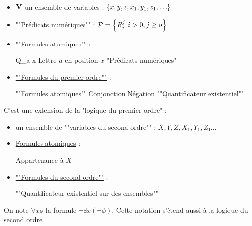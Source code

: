 \begin{definition} 
	\ \newline
	\begin{itemize}
		\item $\mathbf{V}$ un ensemble de variables : $\left\{x,y,z,x_1,y_1,z_1, \ldots\right\}$
		\item \underline{""Prédicats numériques""} :  $\mathcal{P} = \left\{R_i^j, i > 0, j \geq o\right\}$
		\item \underline{""Formules atomiques""} :
		      \begin{syntaxdef}
			      \syntaxHeader {\alpha} {Q_a x} {Lettre $a$ en position $x$}
			       {"Prédicats numériques"}
		      \end{syntaxdef}
		\item \underline{""Formules du premier ordre""} :
		      \begin{syntaxdef}
			      \syntaxHeader {\phi} {\alpha} {""Formules atomiques""}
			      \syntax {\phi \land \phi} {Conjonction}
			      \syntax {\lnot \phi} {Négation}
			       {""Quantificateur existentiel""}
		      \end{syntaxdef}
	\end{itemize}
\end{definition}


\begin{definition} 
	C'est une extension de la "logique du premier ordre" :
	\begin{itemize}
		\item un ensemble de ""variables du second ordre"" : $X,Y,Z,X_1,Y_1,Z_1 \ldots$
		\item \underline{Formules atomiques} :
		      \begin{syntaxdef}
			      \syntaxExtension{\alpha}
			       {Appartenance à $X$}
		      \end{syntaxdef}
		\item \underline{""Formules du second ordre""} :
		      \begin{syntaxdef}
			      \syntaxExtension{\phi}
			       {""Quantificateur existentiel sur des ensembles""}
		      \end{syntaxdef}
	\end{itemize}
\end{definition}


\begin{notation}
	On note $\forall x \phi$ la formule $\lnot \exists x (\lnot \phi)$. Cette notation s'étend aussi
	à la logique du second ordre.
\end{notation}

